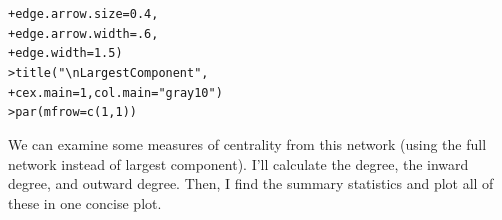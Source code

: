 \documentclass[12pt]{article}\usepackage[]{graphicx}\usepackage[]{color}
\makeatletter
\newcommand{\hlnum}[1]{\textcolor[rgb]{0.82,0.78,0.62}{#1}}%
\newcommand{\hlstr}[1]{\textcolor[rgb]{0.82,0.78,0.62}{#1}}%
\newcommand{\hlstd}[1]{\textcolor[rgb]{0.882,0.878,0.898}{#1}}%
\newcommand{\hlkwc}[1]{\textcolor[rgb]{0.812,0.522,0.388}{#1}}%
\newcommand{\hlkwd}[1]{\textcolor[rgb]{0.733,0.388,0.812}{#1}}%
\newenvironment{kframe}{%
 \def\at@end@of@kframe{}%
 \ifinner\ifhmode%
  \def\at@end@of@kframe{\end{minipage}}%
  \begin{minipage}{\columnwidth}%
 \fi\fi%
 \def\FrameCommand##1{\hskip\@totalleftmargin \hskip-\fboxsep
 \colorbox{shadecolor}{##1}\hskip-\fboxsep
     \hskip-\linewidth \hskip-\@totalleftmargin \hskip\columnwidth}%
 \MakeFramed {\advance\hsize-\width
   \@totalleftmargin\z@ \linewidth\hsize
   \@setminipage}}%
 {\par\unskip\endMakeFramed%
 \at@end@of@kframe}
\newenvironment{knitrout}{}{} %
\makeatother
\begin{document}
\begin{flushleft}
\begin{center}
\begin{knitrout}
\begin{kframe}
\begin{alltt}
\hlstd{+ }            \hlkwc{edge.arrow.size}\hlstd{=}\hlnum{0.4}\hlstd{,}
\hlstd{+ }            \hlkwc{edge.arrow.width}\hlstd{=}\hlnum{.6}\hlstd{,}
\hlstd{+ }            \hlkwc{edge.width}\hlstd{=}\hlnum{1.5}\hlstd{)}
\hlstd{> }\hlkwd{title}\hlstd{(}\hlstr{"\textbackslash{}n Largest Component"}\hlstd{,}
\hlstd{+ }      \hlkwc{cex.main}\hlstd{=}\hlnum{1}\hlstd{,} \hlkwc{col.main}\hlstd{=}\hlstr{"gray10"}\hlstd{)}
\hlstd{> }\hlkwd{par}\hlstd{(}\hlkwc{mfrow}\hlstd{=}\hlkwd{c}\hlstd{(}\hlnum{1}\hlstd{,}\hlnum{1}\hlstd{))}
\end{alltt}
\end{kframe}
\end{knitrout}
\end{center}

We can examine some measures of centrality from this network (using the full network instead of largest component). I'll calculate the degree, the inward degree, and outward degree. Then, I find the summary statistics and plot all of these in one concise plot.


\end{flushleft}
\end{document}
